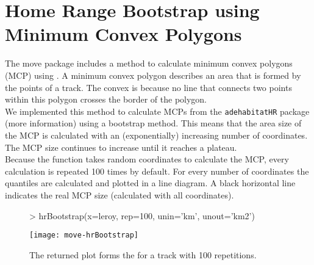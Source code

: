 \documentclass[article,nojss]{jss}
\newcommand{\fct}[1]{{\code{#1()}}}
\begin{document}
\section{Home Range Bootstrap using Minimum Convex Polygons}
The move package includes a method to calculate minimum convex polygons (MCP) using \fct{hrBootstrap}. A minimum convex polygon describes an area that is formed by the points of a track. The convex is because no line that connects two points within this polygon crosses the border of the polygon. \\
We implemented this method to calculate MCPs from the \texttt{adehabitatHR} package (more information) using a bootstrap method. This means that the area size of the MCP is calculated with an (exponentially) increasing number of coordinates. The MCP size continues to increase until it reaches a plateau. \\
Because the function takes random coordinates to calculate the MCP, every calculation is repeated 100 times by default. For every number of coordinates the quantiles are calculated and plotted in a line diagram. A black horizontal line indicates the real MCP size (calculated with all coordinates).

\begin{figure}
\begin{center}
\begin{Schunk}
\begin{Sinput}
> hrBootstrap(x=leroy, rep=100, unin='km', unout='km2')
\end{Sinput}
\end{Schunk}
\texttt{[image: move-hrBootstrap]}
\end{center}
\caption{The returned plot forms the \fct{hrBootstrap} for a track with 100 repetitions.}
\label{fig:four}
\end{figure}
\end{document}
